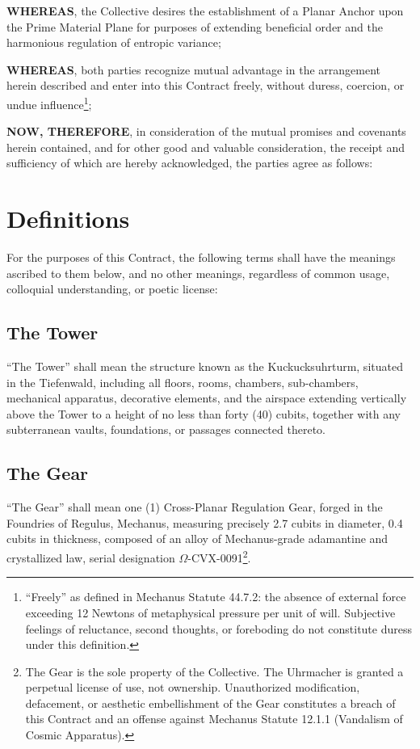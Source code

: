 \documentclass[12pt]{article}
\begin{document}
\textbf{WHEREAS}, the Collective desires the establishment of a Planar
Anchor upon the Prime Material Plane for purposes of extending
beneficial order and the harmonious regulation of entropic variance;

\textbf{WHEREAS}, both parties recognize mutual advantage in the
arrangement herein described and enter into this Contract freely,
without duress, coercion, or undue influence\footnote{``Freely''
as defined in Mechanus Statute 44.7.2: the absence of external
force exceeding 12 Newtons of metaphysical pressure per unit of
will. Subjective feelings of reluctance, second thoughts, or
foreboding do not constitute duress under this definition.};

\textbf{NOW, THEREFORE}, in consideration of the mutual promises and
covenants herein contained, and for other good and valuable
consideration, the receipt and sufficiency of which are hereby
acknowledged, the parties agree as follows:


\section{Definitions}

For the purposes of this Contract, the following terms shall have
the meanings ascribed to them below, and no other meanings, regardless
of common usage, colloquial understanding, or poetic license:

\subsection{The Tower}
``The Tower'' shall mean the structure known as the Kuckucksuhrturm,
situated in the Tiefenwald, including all floors, rooms, chambers,
sub-chambers, mechanical apparatus, decorative elements, and the
airspace extending vertically above the Tower to a height of no less
than forty (40) cubits, together with any subterranean vaults,
foundations, or passages connected thereto.

\subsection{The Gear}
``The Gear'' shall mean one (1) Cross-Planar Regulation Gear, forged
in the Foundries of Regulus, Mechanus, measuring precisely 2.7 cubits
in diameter, 0.4 cubits in thickness, composed of an alloy of
Mechanus-grade adamantine and crystallized law, serial designation
$\Omega$-CVX-0091\footnote{The Gear is the sole property of the
Collective. The Uhrmacher is granted a perpetual license of use,
not ownership. Unauthorized modification, defacement, or aesthetic
embellishment of the Gear constitutes a breach of this Contract and
an offense against Mechanus Statute 12.1.1 (Vandalism of Cosmic
Apparatus).}.
\end{document}
